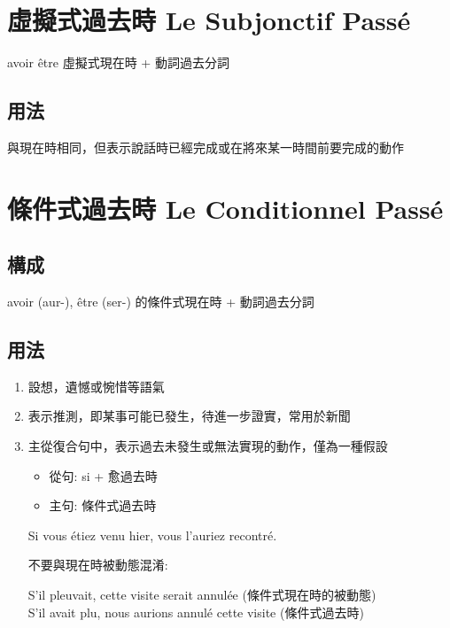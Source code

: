 \documentclass{book}
\begin{document}
    \section{虛擬式過去時 Le Subjonctif Passé}
        avoir être 虛擬式現在時 + 動詞過去分詞
        
        \subsection{用法}
            與現在時相同，但表示說話時已經完成或在將來某一時間前要完成的動作

    \section{條件式過去時 Le Conditionnel Passé}
        \subsection{構成}
            avoir (aur-), être (ser-) 的條件式現在時 + 動詞過去分詞
        \subsection{用法}
            \begin{enumerate}
                \item 設想，遺憾或惋惜等語氣
                \item 表示推測，即某事可能已發生，待進一步證實，常用於新聞
                \item 主從復合句中，表示過去未發生或無法實現的動作，僅為一種假設
                    \begin{itemize}
                        \item 從句: si + 愈過去時
                        \item 主句: 條件式過去時
                    \end{itemize}
                    \begin{center}
                        Si vous étiez venu hier, vous l'auriez recontré.
                    \end{center}
                    不要與現在時被動態混淆:
                    \begin{center}
                        S'il pleuvait, cette visite serait annulée (條件式現在時的被動態)
                        \\
                        S'il avait plu, nous aurions annulé cette visite (條件式過去時)
                    \end{center}
            \end{enumerate}
\end{document}
